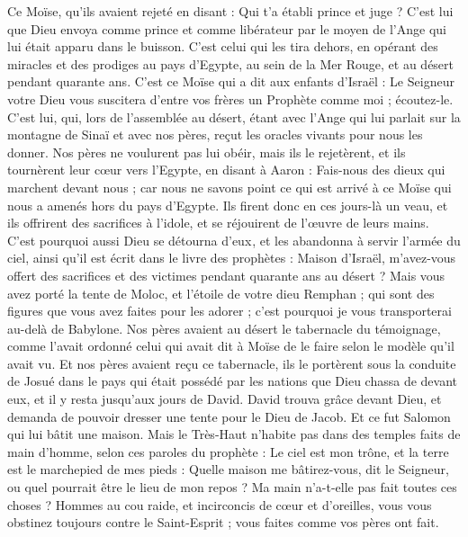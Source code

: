 \begin{multicols}{2}
{Ce Moïse, qu'ils avaient rejeté en disant : Qui t'a établi prince et juge ? C'est lui que Dieu envoya comme prince et comme libérateur par le moyen de l'Ange qui lui était apparu dans le buisson.
C'est celui qui les tira dehors, en opérant des miracles et des prodiges au pays d'Egypte, au sein de la Mer Rouge, et au désert pendant quarante ans.
C'est ce Moïse qui a dit aux enfants d'Israël : Le Seigneur votre Dieu vous suscitera d'entre vos frères un Prophète comme moi ; écoutez-le.
C'est lui, qui, lors de l'assemblée au désert, étant avec l'Ange qui lui parlait sur la montagne de Sinaï et avec nos pères, reçut les oracles vivants pour nous les donner.
Nos pères ne voulurent pas lui obéir, mais ils le rejetèrent, et ils tournèrent leur cœur vers l'Egypte,
en disant à Aaron : Fais-nous des dieux qui marchent devant nous ; car nous ne savons point ce qui est arrivé à ce Moïse qui nous a amenés hors du pays d'Egypte.
Ils firent donc en ces jours-là un veau, et ils offrirent des sacrifices à l'idole, et se réjouirent de l'œuvre de leurs mains.
C'est pourquoi aussi Dieu se détourna {d'eux }, et les abandonna à servir l'armée du ciel, ainsi qu'il est écrit dans le livre des prophètes : Maison d'Israël, m'avez-vous offert des sacrifices et des victimes pendant quarante ans au désert ?
Mais vous avez porté la tente de Moloc, et l'étoile de votre dieu Remphan ; qui sont des figures que vous avez faites pour les adorer ; c'est pourquoi je vous transporterai au-delà de Babylone.
Nos pères avaient au désert le tabernacle du témoignage, comme l'avait ordonné celui qui avait dit à Moïse de le faire selon le modèle qu'il avait vu.
Et nos pères avaient reçu ce tabernacle, ils le portèrent sous la conduite de Josué dans le pays qui était possédé par les nations que Dieu chassa de devant eux, et il y resta jusqu'aux jours de David.
David trouva grâce devant Dieu, et demanda de pouvoir dresser une tente pour le Dieu de Jacob.
Et ce fut Salomon qui lui bâtit une maison.
Mais le Très-Haut n'habite pas dans des temples faits de main d'homme, selon ces paroles du prophète :
Le ciel est mon trône, et la terre est le marchepied de mes pieds : Quelle maison me bâtirez-vous, dit le Seigneur, ou quel pourrait être le lieu de mon repos ?
Ma main n'a-t-elle pas fait toutes ces choses ?
Hommes au cou raide, et incirconcis de cœur et d'oreilles, vous vous obstinez toujours contre le Saint-Esprit ; vous faites comme vos pères ont fait.
}
\end{multicols}
